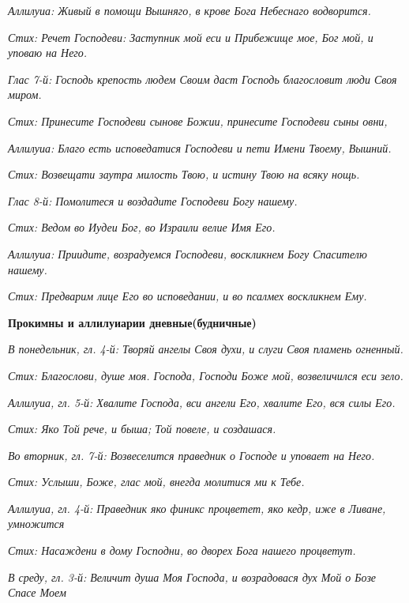 \itshape Аллилуиа:\normalfont{} Живый в помощи Вышняго, в крове Бога Небеснаго водворится.


\itshape Стих:\normalfont{} Речет Господеви: Заступник мой еси и Прибежище мое, Бог мой, и уповаю на Него.


\itshape Глас 7-й:\normalfont{} Господь крепость людем Своим даст Господь благословит люди Своя миром.


\itshape Стих:\normalfont{} Принесите Господеви сынове Божии, принесите Господеви сыны овни,


\itshape Аллилуиа:\normalfont{} Благо есть исповедатися Господеви и пети Имени Твоему, Вышний.


\itshape Стих:\normalfont{} Возвещати заутра милость Твою, и истину Твою на всяку нощь.


\itshape Глас 8-й:\normalfont{} Помолитеся и воздадите Господеви Богу нашему.


\itshape Стих:\normalfont{} Ведом во Иудеи Бог, во Израили велие Имя Его.


\itshape Аллилуиа:\normalfont{} Приидите, возрадуемся Господеви, воскликнем Богу Спасителю нашему.


\itshape Стих:\normalfont{} Предварим лице Его во исповедании, и во псалмех воскликнем Ему.




\medskip
\bfseries Прокимны и аллилуиарии дневные(будничные)\normalfont{}\nopagebreak


\itshape В понедельник, гл. 4-й:\normalfont{} Творяй ангелы Своя духи, и слуги Своя пламень огненный.


\itshape Стих:\normalfont{} Благослови, душе моя. Господа, Господи Боже мой, возвеличился еси зело.


\itshape Аллилуиа, гл. 5-й:\normalfont{} Хвалите Господа, вси ангели Его, хвалите Его, вся силы Его.


\itshape Стих:\normalfont{} Яко Той рече, и быша; Той повеле, и создашася.


\itshape Во вторник, гл. 7-й:\normalfont{} Возвеселится праведник о Господе и уповает на Него.


\itshape Стих:\normalfont{} Услыши, Боже, глас мой, внегда молитися ми к Тебе.


\itshape Аллилуиа, гл. 4-й:\normalfont{} Праведник яко финикс процветет, яко кедр, иже в Ливане, умножится


\itshape Стих:\normalfont{} Насаждени в дому Господни, во дворех Бога нашего процветут.


\itshape В сред\normalfont{}у\itshape , гл. 3-й:\normalfont{} Величит душа Моя Господа, и возрадовася дух Мой о Бозе Спасе Моем


